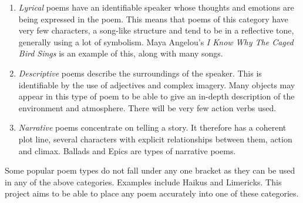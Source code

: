 \begin{enumerate}
\item{\textit{Lyrical} poems have an identifiable speaker whose thoughts and emotions are being expressed in the poem. This means that poems of this category have very few characters, a song-like structure and tend to be in a reflective tone, generally using a lot of symbolism. Maya Angelou's \textit{I Know Why The Caged Bird Sings} is an example of this, along with many songs.}
\item{\textit{Descriptive} poems describe the surroundings of the speaker. This is identifiable by the use of adjectives and complex imagery. Many objects may appear in this type of poem to be able to give an in-depth description of the environment and atmosphere. There will be very few action verbs used.}
\item{\textit{Narrative} poems concentrate on telling a story. It therefore has a coherent plot line, several characters with explicit relationships between them, action and climax. Ballads and Epics are types of narrative poems.}
\end{enumerate}

Some popular poem types do not fall under any one bracket as they can be used in any of the above categories. Examples include Haikus and Limericks. This project aims to be able to place any poem accurately into one of these categories.

